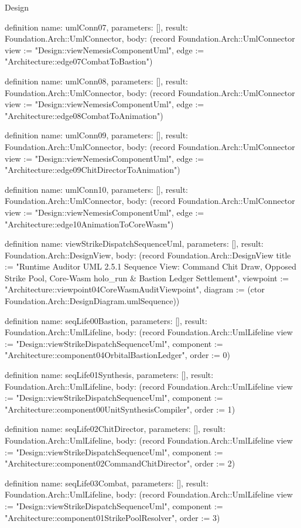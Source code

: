 \begin{lexlean}{Design}
\begin{semanticmodule}
definition{
  name: umlConn07,
  parameters: [],
  result: Foundation.Arch::UmlConnector,
  body: (record Foundation.Arch::UmlConnector {view := "Design::viewNemesisComponentUml", edge := "Architecture::edge07CombatToBastion"})
}

definition{
  name: umlConn08,
  parameters: [],
  result: Foundation.Arch::UmlConnector,
  body: (record Foundation.Arch::UmlConnector {view := "Design::viewNemesisComponentUml", edge := "Architecture::edge08CombatToAnimation"})
}

definition{
  name: umlConn09,
  parameters: [],
  result: Foundation.Arch::UmlConnector,
  body: (record Foundation.Arch::UmlConnector {view := "Design::viewNemesisComponentUml", edge := "Architecture::edge09ChitDirectorToAnimation"})
}

definition{
  name: umlConn10,
  parameters: [],
  result: Foundation.Arch::UmlConnector,
  body: (record Foundation.Arch::UmlConnector {view := "Design::viewNemesisComponentUml", edge := "Architecture::edge10AnimationToCoreWasm"})
}

definition{
  name: viewStrikeDispatchSequenceUml,
  parameters: [],
  result: Foundation.Arch::DesignView,
  body: (record Foundation.Arch::DesignView {title := "Runtime Auditor UML 2.5.1 Sequence View: Command Chit Draw, Opposed Strike Pool, Core-Wasm holo_run & Bastion Ledger Settlement", viewpoint := "Architecture::viewpoint04CoreWasmAuditViewpoint", diagram := (ctor Foundation.Arch::DesignDiagram.umlSequence)})
}

definition{
  name: seqLife00Bastion,
  parameters: [],
  result: Foundation.Arch::UmlLifeline,
  body: (record Foundation.Arch::UmlLifeline {view := "Design::viewStrikeDispatchSequenceUml", component := "Architecture::component04OrbitalBastionLedger", order := 0})
}

definition{
  name: seqLife01Synthesis,
  parameters: [],
  result: Foundation.Arch::UmlLifeline,
  body: (record Foundation.Arch::UmlLifeline {view := "Design::viewStrikeDispatchSequenceUml", component := "Architecture::component00UnitSynthesisCompiler", order := 1})
}

definition{
  name: seqLife02ChitDirector,
  parameters: [],
  result: Foundation.Arch::UmlLifeline,
  body: (record Foundation.Arch::UmlLifeline {view := "Design::viewStrikeDispatchSequenceUml", component := "Architecture::component02CommandChitDirector", order := 2})
}

definition{
  name: seqLife03Combat,
  parameters: [],
  result: Foundation.Arch::UmlLifeline,
  body: (record Foundation.Arch::UmlLifeline {view := "Design::viewStrikeDispatchSequenceUml", component := "Architecture::component01StrikePoolResolver", order := 3})
}


\end{semanticmodule}
\end{lexlean}
